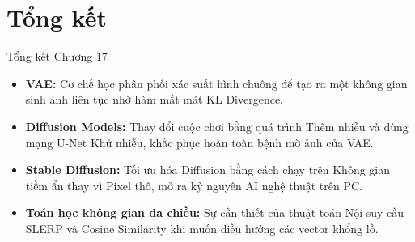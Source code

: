 \documentclass[aspectratio=169]{beamer}
\begin{document}
\section{Tổng kết}

\begin{frame}{Tổng kết Chương 17}
    \begin{itemize}
        \item \textbf{VAE:} Cơ chế học phân phối xác suất hình chuông để tạo ra một không gian sinh ảnh liên tục nhờ hàm mất mát KL Divergence.
        \item \textbf{Diffusion Models:} Thay đổi cuộc chơi bằng quá trình Thêm nhiễu và dùng mạng U-Net Khử nhiễu, khắc phục hoàn toàn bệnh mờ ảnh của VAE.
        \item \textbf{Stable Diffusion:} Tối ưu hóa Diffusion bằng cách chạy trên Không gian tiềm ẩn thay vì Pixel thô, mở ra kỷ nguyên AI nghệ thuật trên PC.
        \item \textbf{Toán học không gian đa chiều:} Sự cần thiết của thuật toán Nội suy cầu SLERP và Cosine Similarity khi muốn điều hướng các vector khổng lồ.
    \end{itemize}
\end{frame}
\end{document}
